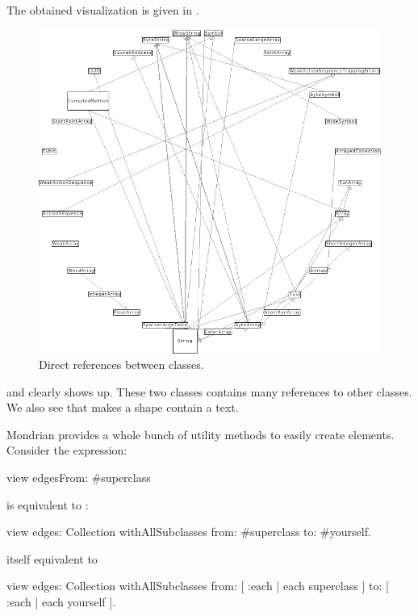 \documentclass[a4paper,10pt,twoside]{book}
\begin{document}
The obtained visualization is given in .

\begin{figure}[htbp]
\centerline{\includegraphics[width=\linewidth]{classDependencies}}
\caption{Direct references between classes.}
\label{fig:classDependencies}
\end{figure}

 and  clearly shows up. These two classes contains many references to other classes.
We also see that  makes a shape contain a text.

Mondrian provides a whole bunch of utility methods to easily create elements.  Consider the expression:
\begin{code}{}
view edgesFrom: #superclass
\end{code}

 is equivalent to  :

\begin{code}{}
view edges: Collection withAllSubclasses from: #superclass to: #yourself.
\end{code}
itself equivalent to
\begin{code}{}
view 
  edges: Collection withAllSubclasses 
  from: [ :each | each superclass ] 
  to: [ :each | each yourself ].
\end{code}
\end{document}
